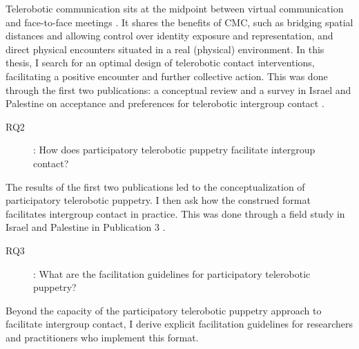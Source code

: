 \documentclass[dissertation,math,vertlayout,pdfa,colorlinks]{aaltoseries}
\begin{document}
Telerobotic communication sits at the midpoint between virtual communication and face-to-face meetings \cite{peledPotentialTelepresenceRobots2020}. It shares the benefits of CMC, such as bridging spatial distances and allowing control over identity exposure and representation, and direct physical encounters situated in a real (physical) environment. In this thesis, I search for an optimal design of telerobotic contact interventions, facilitating a positive encounter and further collective action. This was done through the first two publications: a conceptual review \cite{peledTelerobotContactHypothesis2022} and a survey in Israel and Palestine on acceptance and preferences for telerobotic intergroup contact \cite{peledTeleroboticIntergroupContact2024}.

\begin{description}
\item[RQ2]: How does participatory telerobotic puppetry facilitate intergroup contact?
\end{description}

The results of the first two publications led to the conceptualization of participatory telerobotic puppetry. I then ask how the construed format facilitates intergroup contact in practice. This was done through a field study in Israel and Palestine in Publication 3 \cite{peledTeleroboticTheaterOppressed2025}.

\begin{description}
\item[RQ3]: What are the facilitation guidelines for participatory telerobotic puppetry?
\end{description}

Beyond the capacity of the participatory telerobotic puppetry approach to facilitate intergroup contact, I derive explicit facilitation guidelines for researchers and practitioners who implement this format.



\end{document}
